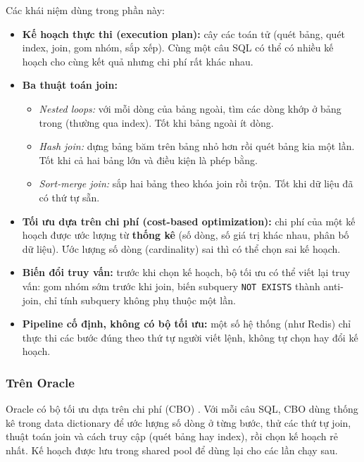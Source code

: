 Các khái niệm dùng trong phần này:
\begin{itemize}
  \item \textbf{Kế hoạch thực thi (execution plan):} cây các toán tử (quét bảng, quét index, join, gom nhóm, sắp xếp). Cùng một câu SQL có thể có nhiều kế hoạch cho cùng kết quả nhưng chi phí rất khác nhau.
  \item \textbf{Ba thuật toán join:}
  \begin{itemize}
    \item \textit{Nested loops:} với mỗi dòng của bảng ngoài, tìm các dòng khớp ở bảng trong (thường qua index). Tốt khi bảng ngoài ít dòng.
    \item \textit{Hash join:} dựng bảng băm trên bảng nhỏ hơn rồi quét bảng kia một lần. Tốt khi cả hai bảng lớn và điều kiện là phép bằng.
    \item \textit{Sort-merge join:} sắp hai bảng theo khóa join rồi trộn. Tốt khi dữ liệu đã có thứ tự sẵn.
  \end{itemize}
  \item \textbf{Tối ưu dựa trên chi phí (cost-based optimization):} chi phí của một kế hoạch được ước lượng từ \textbf{thống kê} (số dòng, số giá trị khác nhau, phân bố dữ liệu). Ước lượng số dòng (cardinality) sai thì có thể chọn sai kế hoạch.
  \item \textbf{Biến đổi truy vấn:} trước khi chọn kế hoạch, bộ tối ưu có thể viết lại truy vấn: gom nhóm sớm trước khi join, biến subquery \texttt{NOT EXISTS} thành anti-join, chỉ tính subquery không phụ thuộc một lần.
  \item \textbf{Pipeline cố định, không có bộ tối ưu:} một số hệ thống (như Redis) chỉ thực thi các bước đúng theo thứ tự người viết lệnh, không tự chọn hay đổi kế hoạch.
\end{itemize}

\subsubsection{Trên Oracle}\label{sec:q-oracle}

Oracle có bộ tối ưu dựa trên chi phí (CBO) \cite{q-oracle-optimizer}. Với mỗi câu SQL, CBO dùng thống kê trong data dictionary để ước lượng số dòng ở từng bước, thử các thứ tự join, thuật toán join và cách truy cập (quét bảng hay index), rồi chọn kế hoạch rẻ nhất. Kế hoạch được lưu trong shared pool để dùng lại cho các lần chạy sau.

